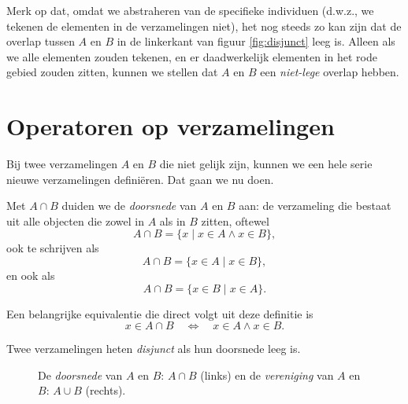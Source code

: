 Merk op dat, omdat we abstraheren van de specifieke individuen (d.w.z., we tekenen de elementen in de verzamelingen niet), het nog steeds zo kan zijn dat de overlap tussen $A$ en $B$ in de linkerkant van figuur \ref{fig:disjunct} leeg is. Alleen als we alle elementen zouden tekenen, en er daadwerkelijk elementen in het rode gebied zouden zitten, kunnen we stellen dat $A$ en $B$ een \textit{niet-lege} overlap hebben.

\section{Operatoren op verzamelingen}\label{sec:operator}
Bij twee verzamelingen $A$ en $B$ die niet gelijk zijn, kunnen we een hele serie nieuwe verzamelingen defini\"eren. Dat gaan we nu doen.

Met $A\cap B$ duiden we de \textit{doorsnede} van $A$ en $B$ aan: de verzameling die bestaat uit alle objecten die zowel in $A$ als in $B$ zitten, oftewel
$$A\cap B=\{x\;|\; x\in A\land x\in B\},$$
ook te schrijven als
$$A\cap B=\{x\in A\;|\; x\in B\},$$
en ook als
$$A\cap B=\{x\in B\;|\; x\in A\}.$$

Een belangrijke equivalentie die direct volgt uit deze definitie is
$$x\in A\cap B\quad\Leftrightarrow\quad x\in A\land x\in B.$$

Twee verzamelingen heten \textit{disjunct} als hun doorsnede leeg is.
\begin{figure}[ht]
    \centering
    \hspace{1cm} 
    \caption{De \textit{doorsnede} van $A$ en $B$: $A\cap B$ (links) en de \textit{vereniging} van $A$ en $B$: $A\cup B$ (rechts).}
    \label{fig:intersect:union}
\end{figure}


